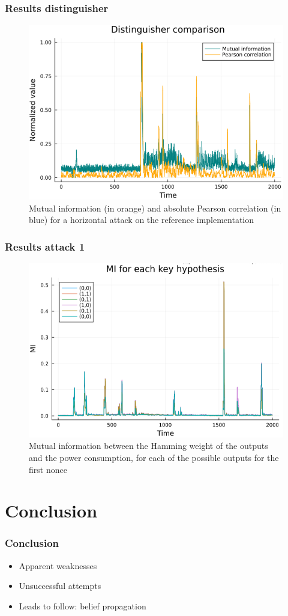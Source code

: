 \documentclass{beamer}
\begin{document}
	\begin{frame}
		\frametitle{Results distinguisher}
		\begin{figure}
			\centering
			\includegraphics[scale=0.3]{corr_vs_MI_hHW}
			\caption{Mutual information (in orange) and absolute Pearson correlation (in blue) for a horizontal attack on the reference implementation}
			\label{corvsMI}
		\end{figure}
	\end{frame}
	
	\begin{frame}
		\frametitle{Results attack 1}
		\begin{figure}[h]
			\centering
			\includegraphics[scale=0.3]{nonces_alea}
			\caption{Mutual information between the Hamming weight of the outputs and the power consumption, for each of the possible outputs for the first nonce}
			\label{all_alea}
		\end{figure}
	\end{frame}
	
	\section{Conclusion}
	\begin{frame}
		\frametitle{Conclusion}
		\begin{itemize}
			\item Apparent weaknesses
			\item Unsuccessful attempts
			\item Leads to follow: belief propagation
		\end{itemize}
	\end{frame}
	
\end{document}
